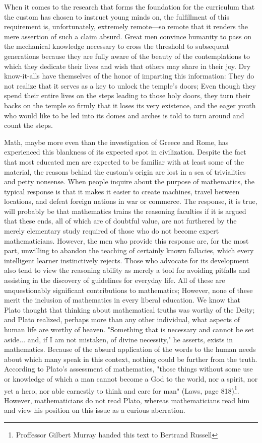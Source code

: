 \documentclass[a4paper,12pt]{book}[2004/02/16]
\theoremstyle{ilemma}
\theoremstyle{itheorem}
\theoremstyle{iother}
\theoremstyle{icorollary}
\theoremstyle{numcorollary}
\theoremstyle{idefinition}
\begin{document}
When it comes to the research that forms the foundation for the curriculum that the custom has chosen to instruct young minds on, the fulfillment of this requirement is, unfortunately, extremely remote—so remote that it renders the mere assertion of such a claim absurd. Great men convince humanity to pass on the mechanical knowledge necessary to cross the threshold to subsequent generations because they are fully aware of the beauty of the contemplations to which they dedicate their lives and wish that others may share in their joy. Dry know-it-alls have themselves of
the honor of imparting this information: They do not realize that it serves as a key to unlock the temple's doors; Even though they spend their entire lives on the steps leading to those holy doors, they turn their backs on the temple so firmly that it loses its very existence, and the eager youth who would like to be led into its domes and arches is told to turn around and count the steps.

Math, maybe more even than the investigation of Greece and Rome, has
experienced this blankness of its expected spot in civilization. Despite the fact that most educated men are expected to be familiar with at least some of the material, the reasons behind the custom's origin are lost in a sea of trivialities and petty nonsense. When people inquire about the purpose of mathematics, the typical response is that it makes it easier to create machines, travel between locations, and defeat foreign nations in war or commerce. The response, it is true, will probably be that mathematics trains the reasoning faculties if it is argued that these ends, all of which are of doubtful value, are not furthered by the merely elementary study required of those who do not become expert mathematicians. However, the men who provide this response are, for the most part, unwilling to abandon the teaching of certainly known fallacies, which every intelligent learner instinctively rejects. Those who advocate for its development also tend to view the reasoning ability as merely a tool for avoiding pitfalls and assisting in the discovery of guidelines for everyday life. All of these are unquestionably significant contributions to mathematics; However, none of these merit the inclusion of mathematics in every liberal education. We know that Plato thought that thinking about mathematical truths was worthy of the Deity; and Plato realized, perhaps more than any other individual, what aspects of human life are worthy of heaven. "Something that is necessary and cannot be set aside... and, if I am not mistaken, of divine necessity," he asserts, exists in mathematics. Because of the absurd application of the words to the human needs about which many speak in this context, nothing could be further from the truth.
According to Plato's assessment of mathematics, "those things without some use or knowledge of which a man cannot become a God to the world, nor a spirit, nor yet a hero, nor able earnestly to think and care for man" (Laws, page 818)\footnote{Proffessor Gilbert Murray handed this text to Bertrand Russell}.
However, mathematicians do not read Plato, whereas mathematicians read him and view his position on this issue as a curious aberration.
\end{document}

